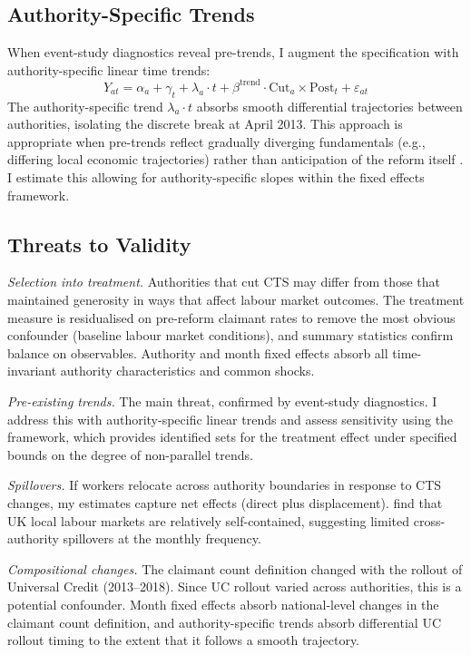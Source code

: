 \documentclass[12pt]{article}
\begin{document}
\subsection{Authority-Specific Trends}

When event-study diagnostics reveal pre-trends, I augment the specification with authority-specific linear time trends:
\begin{equation}
\label{eq:trends}
Y_{at} = \alpha_a + \gamma_t + \lambda_a \cdot t + \beta^{\text{trend}} \cdot \text{Cut}_a \times \text{Post}_t + \varepsilon_{at}
\end{equation}
The authority-specific trend $\lambda_a \cdot t$ absorbs smooth differential trajectories between authorities, isolating the discrete break at April 2013. This approach is appropriate when pre-trends reflect gradually diverging fundamentals (e.g., differing local economic trajectories) rather than anticipation of the reform itself \citep{meyer1995natural}. I estimate this allowing for authority-specific slopes within the fixed effects framework.

\subsection{Threats to Validity}

\emph{Selection into treatment.} Authorities that cut CTS may differ from those that maintained generosity in ways that affect labour market outcomes. The treatment measure is residualised on pre-reform claimant rates to remove the most obvious confounder (baseline labour market conditions), and summary statistics confirm balance on observables. Authority and month fixed effects absorb all time-invariant authority characteristics and common shocks.

\emph{Pre-existing trends.} The main threat, confirmed by event-study diagnostics. I address this with authority-specific linear trends and assess sensitivity using the \citet{rambachan2023more} framework, which provides identified sets for the treatment effect under specified bounds on the degree of non-parallel trends.

\emph{Spillovers.} If workers relocate across authority boundaries in response to CTS changes, my estimates capture net effects (direct plus displacement). \citet{manning2014coase} find that UK local labour markets are relatively self-contained, suggesting limited cross-authority spillovers at the monthly frequency.

\emph{Compositional changes.} The claimant count definition changed with the rollout of Universal Credit (2013--2018). Since UC rollout varied across authorities, this is a potential confounder. Month fixed effects absorb national-level changes in the claimant count definition, and authority-specific trends absorb differential UC rollout timing to the extent that it follows a smooth trajectory.
\end{document}
